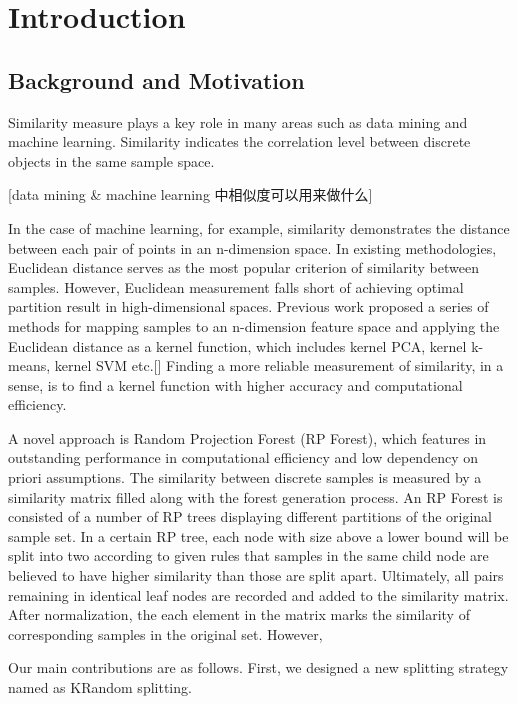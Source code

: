 \section{Introduction}

\subsection{Background and Motivation}
Similarity measure plays a key role in many areas such as data mining and machine learning. Similarity indicates the correlation level between discrete objects in the same sample space. 

[data mining & machine learning 中相似度可以用来做什么] 

In the case of machine learning, for example, similarity demonstrates the distance between each pair of points in an n-dimension space. In existing methodologies, Euclidean distance serves as the most popular criterion of similarity between samples. However, Euclidean measurement falls short of achieving optimal partition result in high-dimensional spaces. Previous work proposed a series of methods for mapping samples to an n-dimension feature space and applying the Euclidean distance as a kernel function, which includes kernel PCA, kernel k-means, kernel SVM etc.[] Finding a more reliable measurement of similarity, in a sense, is to find a kernel function with higher accuracy and computational efficiency.

A novel approach is Random Projection Forest (RP Forest), which features in outstanding performance in computational efficiency and low dependency on priori assumptions. The similarity between discrete samples is measured by a similarity matrix filled along with the forest generation process. An RP Forest is consisted of a number of RP trees displaying different partitions of the original sample set. In a certain RP tree, each node with size above a lower bound will be split into two according to given rules that samples in the same child node are believed to have higher similarity than those are split apart. Ultimately, all pairs remaining in identical leaf nodes are recorded and added to the similarity matrix. After normalization, the each element in the matrix marks the similarity of corresponding samples in the original set.
However, 

Our main contributions are as follows. First, we designed a new splitting strategy named as KRandom splitting. 

